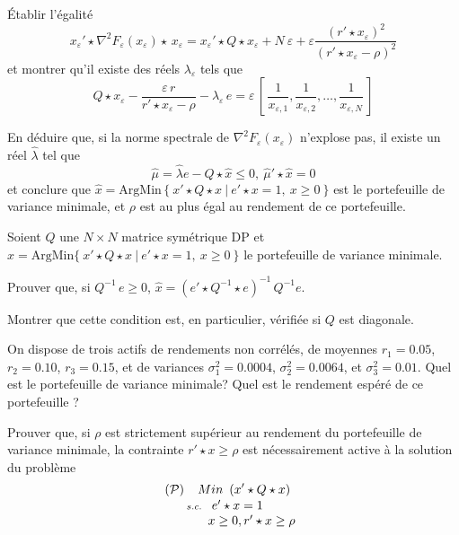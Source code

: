 \documentclass[12pt,a4paper,fleqn]{report}
\newcommand{\hess}{\nabla^2}
\newcommand{\on}{\begin{displaymath}}
\newcommand{\off}{\end{displaymath}}
\renewcommand{\P}{\mathcal P}
\newcommand{\push}[1]{\rule{0pt}{0pt}\hspace{#1pt}}
\begin{document}
\begin{exercice}
\begin{questions}
\begin{subquestions}
\end{subquestions}
\item \'Etablir l'\'egalit\'e
\on x_{\varepsilon} '\star \hess F_{\varepsilon}(x_{\varepsilon}) \star \,x_{\varepsilon} = x_{\varepsilon}'\star Q\star x_{\varepsilon} + N\ \varepsilon +\varepsilon \frac{(r'\star x_{\varepsilon})^2}{(r'\star x_{\varepsilon}-\rho)^2} \off
et montrer qu'il existe des r\'eels $\lambda_{\varepsilon}$ tels que
\on Q\star x_{\varepsilon} -\frac{\varepsilon\,r}{r'\star x_{\varepsilon}-\rho} -\lambda_{\varepsilon}\,e=\varepsilon\,\left[\, \frac{1}{x_{\varepsilon,1}}, \frac{1}{x_{\varepsilon,2}}, \ldots, \frac{1}{x_{\varepsilon,N}}\,\right] \off
\item En d\'eduire que, si la norme spectrale de $\hess F_{\varepsilon}(x_{\varepsilon})$ n'explose pas, il existe un r\'eel $\hat \lambda$ tel que
\on \hat \mu = \hat \lambda e - Q \star \hat x \leq 0, \ \hat \mu' \star \hat x =0 \off
et conclure que $\hat x = \mathrm{ArgMin}\,\{\ x'\star Q\star x\ |\ e'\star x=1,\ x\geq 0\ \}$ est le portefeuille de variance minimale, et $\rho$ est au plus \'egal au rendement de ce portefeuille.
\end{questions}
\end{exercice}

\begin{exercice}
Soient $Q$ une $N\times N$ matrice sym\'etrique DP et $\hat x= \mathrm{ArgMin} \{\ x'\star Q \star x\ |\ e'\star x=1, \ x\geq 0\ \}$ le portefeuille de variance minimale.
\begin{questions}
\item Prouver que, si $Q^{-1}\,e\geq 0$, $\hat x=(e'\star Q^{-1}\star e)^{-1}\,Q^{-1}e$.
\item Montrer que cette condition est, en particulier, v\'erifi\'ee si $Q$ est diagonale.
\item On dispose de trois actifs de rendements non corr\'el\'es, de moyennes $r_1=0.05$, $r_2=0.10$, $r_3=0.15$, et de variances $\sigma_1^2=0.0004$, $\sigma_2^2=0.0064$, et $\sigma_3^2=0.01$. Quel est le portefeuille de variance minimale? Quel est le rendement esp\'er\'e de ce portefeuille ?
\item Prouver que, si $\rho$ est strictement sup\'erieur au rendement du portefeuille de variance minimale, la contrainte $r'\star x \geq \rho$ est n\'ecessairement active \`a la solution du probl\`eme
\on (\P) \push{2} \underset{s. c.\push{3}\begin{array}[t]{l} e'\star x=1\\ \push{-3}x\geq 0, r'\star x\geq \rho\end{array}}
{Min\push{5} (x'\star Q\star x)} \off
\end{questions}
\end{exercice}
\end{document}
